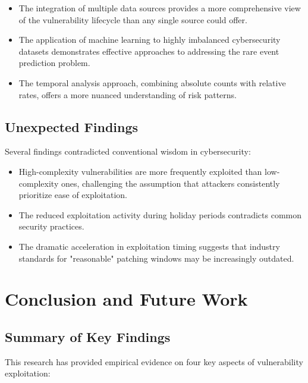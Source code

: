 \documentclass[runningheads]{llncs}
\begin{document}
\begin{itemize}
    \item The integration of multiple data sources provides a more comprehensive view of the vulnerability lifecycle than any single source could offer.
    
    \item The application of machine learning to highly imbalanced cybersecurity datasets demonstrates effective approaches to addressing the rare event prediction problem.
    
    \item The temporal analysis approach, combining absolute counts with relative rates, offers a more nuanced understanding of risk patterns.
\end{itemize}

\subsection{Unexpected Findings}
Several findings contradicted conventional wisdom in cybersecurity:

\begin{itemize}
    \item High-complexity vulnerabilities are more frequently exploited than low-complexity ones, challenging the assumption that attackers consistently prioritize ease of exploitation.
    
    \item The reduced exploitation activity during holiday periods contradicts common security practices.
    
    \item The dramatic acceleration in exploitation timing suggests that industry standards for "reasonable" patching windows may be increasingly outdated.
\end{itemize}

\section{Conclusion and Future Work}
\label{sec:conclusion}

\subsection{Summary of Key Findings}
This research has provided empirical evidence on four key aspects of vulnerability exploitation:
\end{document}
